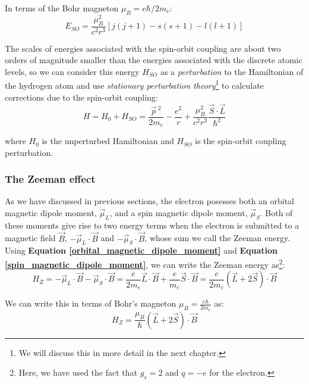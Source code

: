 In terms of the Bohr magneton $\mu_B = e\hbar/2m_e$:
\begin{equation}
    E_{SO} = \frac{\mu_B^2}{c^2r^3} \left[j(j+1)-s(s+1)-l(l+1)\right]
\end{equation}

The scales of energies associated with the spin-orbit coupling are about two orders of magnitude smaller than the energies associated with the discrete atomic levels, so we can consider this energy $H_{SO}$ as a \textit{perturbation} to the Hamiltonian of the hydrogen atom and use \textit{stationary perturbation theory}\footnote{We will discuss this in more detail in the next chapter.} to calculate corrections due to the spin-orbit coupling:
\begin{equation}
    H = H_0 + H_{SO} = \frac{\vec{p}\,^2}{2m_e}-\frac{e^2}{r} + \frac{\mu_B^2}{c^2r^3}\frac{\vec{S}\cdot \vec{L}}{\hbar^2}
\end{equation}

where $H_0$ is the unperturbed Hamiltonian and $H_{SO}$ is the spin-orbit coupling perturbation.

\subsubsection{The Zeeman effect}

As we have discussed in previous sections, the electron posesses both an orbital magnetic dipole moment, $\vec{\mu}_L$, and a spin magnetic dipole moment, $\vec{\mu}_S$. Both of these moments give rise to two energy terms when the electron is submitted to a magnetic field $\vec{B}$, $-\vec{\mu}_L\cdot \vec{B}$ and $-\vec{\mu}_S\cdot \vec{B}$, whose sum we call the Zeeman energy. Using \textbf{Equation \ref{orbital_magnetic_dipole_moment}} and \textbf{Equation \ref{spin_magnetic_dipole_moment}}, we can write the Zeeman energy as\footnote{Here, we have used the fact that $g_s = 2$ and $q=-e$ for the electron.}:
\begin{equation}
    H_Z = -\vec{\mu}_L\cdot \vec{B} - \vec{\mu}_S\cdot \vec{B} = \frac{e}{2m_e}\vec{L}\cdot \vec{B} + \frac{e}{m_e}\vec{S}\cdot \vec{B} = \frac{e}{2m_e}\left(\vec{L}+2\vec{S}\right)\cdot \vec{B}
\end{equation}

We can write this in terms of Bohr's magneton $\mu_B = \frac{e\hbar}{2m_e}$ as:
\begin{equation}
    H_Z = \frac{\mu_B }{\hbar}\left(\vec{L}+2\vec{S}\right)\cdot \vec{B}
\end{equation}

